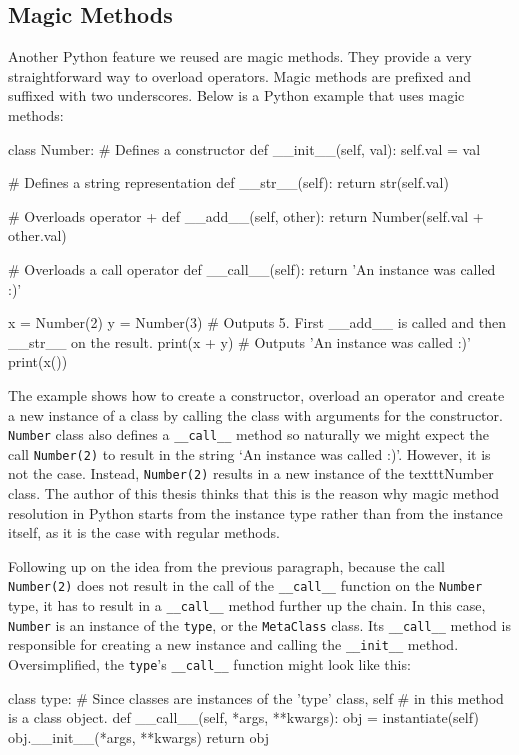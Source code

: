 \subsection{Magic Methods}
Another Python feature we reused are magic methods. They provide a very straightforward way
to overload operators. Magic methods are prefixed and suffixed with two underscores. Below is a Python example that uses magic methods:
\begin{code}
class Number:
    # Defines a constructor
    def __init__(self, val):
        self.val = val
    
    # Defines a string representation
    def __str__(self):
        return str(self.val)

    # Overloads operator +
    def __add__(self, other):
        return Number(self.val + other.val)

    # Overloads a call operator
    def __call__(self):
        return 'An instance was called :)'

x = Number(2)
y = Number(3)
# Outputs 5. First __add__ is called and then __str__ on the result.
print(x + y)
# Outputs 'An instance was called :)'
print(x())
\end{code}

The example shows how to create a constructor, overload an operator and create a new instance of a class by calling the class with arguments for the constructor.
\texttt{Number} class also defines a \texttt{\_\_call\_\_} method so naturally we might expect the call \texttt{Number(2)} to result in the string
`An instance was called :)'. However, it is not the case. Instead, \texttt{Number(2)} results in a new instance of the texttt{Number} class. The author of this
thesis thinks that this is the reason why magic method resolution in Python starts from the instance type rather than from the instance itself, as it is
the case with regular methods.

Following up on the idea from the previous paragraph, because the call \texttt{Number(2)} does not result in the call of the \texttt{\_\_call\_\_} function on the
\texttt{Number} type, it has to result in a \texttt{\_\_call\_\_} method further up the chain. In this case, \texttt{Number} is an instance of the \texttt{type},
or the \texttt{MetaClass} class. Its \texttt{\_\_call\_\_} method is responsible for creating a new instance and calling the \texttt{\_\_init\_\_} method. Oversimplified,
the \texttt{type}'s \texttt{\_\_call\_\_} function might look like this:
\begin{code}
class type:
    # Since classes are instances of the 'type' class, self
    # in this method is a class object. 
    def __call__(self, *args, **kwargs):
        obj = instantiate(self)
        obj.__init__(*args, **kwargs)
        return obj
\end{code}

